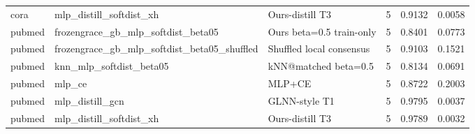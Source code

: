 \begin{table}[t]
\begin{tabular}{llllll}
cora & mlp_distill_softdist_xh & Ours-distill T3 & 5 & 0.9132 & 0.0058 \\
pubmed & frozengrace_gb_mlp_softdist_beta05 & Ours beta=0.5 train-only & 5 & 0.8401 & 0.0773 \\
pubmed & frozengrace_gb_mlp_softdist_beta05_shuffled & Shuffled local consensus & 5 & 0.9103 & 0.1521 \\
pubmed & knn_mlp_softdist_beta05 & kNN@matched beta=0.5 & 5 & 0.8134 & 0.0691 \\
pubmed & mlp_ce & MLP+CE & 5 & 0.8722 & 0.2003 \\
pubmed & mlp_distill_gcn & GLNN-style T1 & 5 & 0.9795 & 0.0037 \\
pubmed & mlp_distill_softdist_xh & Ours-distill T3 & 5 & 0.9789 & 0.0032 \\
\bottomrule
\end{tabular}
\end{table}
